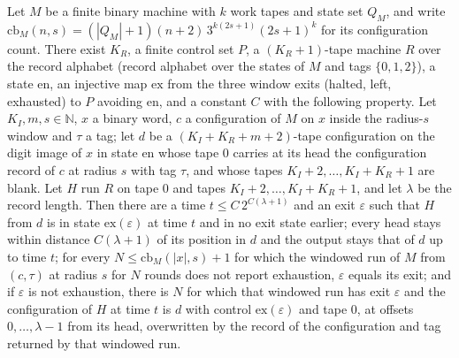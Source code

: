 \begin{lemma}
\label{Complexity.sph_runner_run}
\leanok
{}
Let $M$ be a finite binary machine with $k$ work tapes and state set $Q_M$, and write
$\mathrm{cb}_M(n,s)=(|Q_M|+1)(n+2)\,3^{k(2s+1)}(2s+1)^{k}$ for its configuration count. There exist $K_R$, a finite control set $P$, a
$(K_R+1)$-tape machine $R$ over the record alphabet (record alphabet over the states of $M$ and tags $\{0,1,2\}$), a state $\mathrm{en}$, an
injective map $\mathrm{ex}$ from the three window exits (halted, left, exhausted) to $P$ avoiding
$\mathrm{en}$, and a constant $C$ with the following property. Let $K_I,m,s\in\mathbb{N}$, $x$ a
binary word, $c$ a configuration of $M$ on $x$ inside the radius-$s$ window and $\tau$ a tag; let
$d$ be a $(K_I+K_R+m+2)$-tape configuration on the digit image of $x$ in state $\mathrm{en}$ whose
tape $0$ carries at its head the configuration record of $c$ at radius $s$ with tag $\tau$, and
whose tapes $K_I+2,\dots,K_I+K_R+1$ are blank. Let $H$ run $R$ on tape $0$ and tapes
$K_I+2,\dots,K_I+K_R+1$, and let $\lambda$ be the record length. Then there are a time
$t\le C\,2^{C(\lambda+1)}$ and an exit $\varepsilon$ such that $H$ from $d$ is in state
$\mathrm{ex}(\varepsilon)$ at time $t$ and in no exit state earlier; every head stays within
distance $C(\lambda+1)$ of its position in $d$ and the output stays that of $d$ up to time $t$;
for every $N\le\mathrm{cb}_M(|x|,s)+1$ for which the windowed run of $M$ from $(c,\tau)$ at radius
$s$ for $N$ rounds does not report exhaustion, $\varepsilon$ equals its exit; and if
$\varepsilon$ is not exhaustion, there is $N$ for which that windowed run has exit $\varepsilon$
and the configuration of $H$ at time $t$ is $d$ with control $\mathrm{ex}(\varepsilon)$ and tape
$0$, at offsets $0,\dots,\lambda-1$ from its head, overwritten by the record of the configuration
and tag returned by that windowed run.
\end{lemma}

